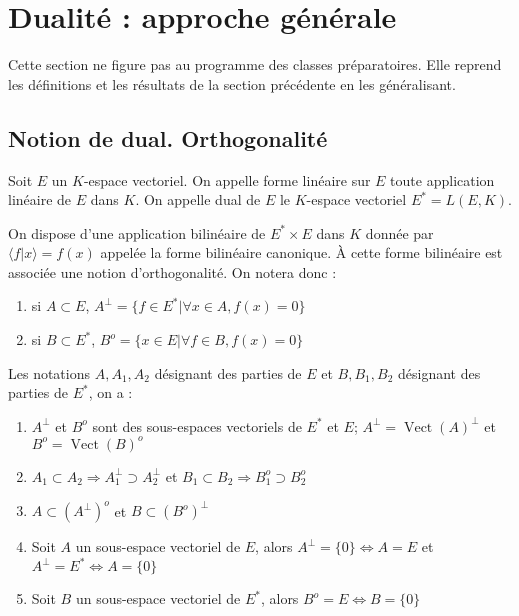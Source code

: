 \section{Dualité : approche générale}

\begin{rem}
Cette section ne figure pas au programme des classes préparatoires. Elle reprend les définitions et les résultats de la section précédente en les généralisant.
\end{rem}

\subsection{Notion de dual. Orthogonalité}

\begin{de}
Soit $E$ un $K$-espace vectoriel. On appelle forme linéaire sur $E$ toute application linéaire de $E$ dans $K$. On appelle dual de $E$ le $K$-espace vectoriel $E^* = L(E,K)$.
\end{de}

\begin{rem}
On dispose d'une application bilinéaire de $E^*\times E$ dans $K$ donnée par $\langle f|x\rangle = f(x)$ appelée la forme bilinéaire canonique. À cette forme bilinéaire est associée une notion d'orthogonalité. On notera donc :
\begin{enumerate}
\item si $A \subset E$, $A^\perp = \{f \in E^* | \forall x \in A, f(x) = 0\}$
\item si $B \subset E^*$, $B^o = \{x \in E | \forall f \in B, f(x) = 0\}$
\end{enumerate}
\end{rem}

\begin{prop}
Les notations $A,A_1,A_2$ désignant des parties de $E$ et $B,B_1,B_2$ désignant des parties de $E^*$, on a :
\begin{enumerate}
\item $A^\perp$ et $B^o$ sont des sous-espaces vectoriels de $E^*$ et $E$; $A^\perp = \operatorname{Vect}(A)^\perp$ et $B^o = \operatorname{Vect}(B)^o$
\item $A_1 \subset A_2 \Rightarrow A_1^\perp \supset A_2^\perp$ et $B_1 \subset B_2 \Rightarrow B_1^o \supset B_2^o$
\item $A \subset (A^\perp)^o$ et $B \subset (B^o)^\perp$
\item Soit $A$ un sous-espace vectoriel de $E$, alors $A^\perp = \{0\} \Leftrightarrow A = E$ et $A^\perp = E^* \Leftrightarrow A = \{0\}$
\item Soit $B$ un sous-espace vectoriel de $E^*$, alors $B^o = E \Leftrightarrow B = \{0\}$
\end{enumerate}
\end{prop}

